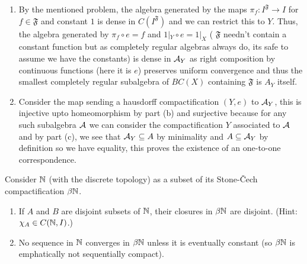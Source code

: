 \documentclass[12pt,a4paper]{article}
\begin{document}
\begin{solution}
\begin{enumerate}[label=\alph*.]
        Thus, $\Phi|_{\beta Y}$ is also a homeomorphism into $\beta Y'$ and we can define a homeomorphism $\phi=i'^{-1}\circ\Phi|_{\beta Y}\circ i$ from $Y$ to $Y'$ for which $\phi\circ e=i'^{-1}\circ\Phi|_{\beta Y}\circ i\circ e=i^{-1}\circ i'\circ e'=e'$ and we are done.
    \item By the mentioned problem, the algebra generated by the maps $\pi_f:I^{\mathfrak F}\to I$ for $f\in\mathfrak F$ and constant $1$ is dense in $C(I^{\mathfrak F})$ and we can restrict this to $Y$. 
        Thus, the algebra generated by $\pi_f\circ e=f$ and $1|_Y\circ e=1|_X$ ( $\mathfrak F$ needn't contain a constant function but as completely regular algebras always do, its safe to assume we have the constants) is dense in $\mathcal{A}_Y$ as right composition by continuous functions (here it is $e$) preserves uniform convergence and thus the smallest completely regular subalgebra of $BC(X)$ containing $\mathfrak F$ is $A_Y$ itself. 
    \item Consider the map sending a hausdorff compactification $(Y,e)$ to $\mathcal{A}_Y$, this is injective upto homeomorphism by part (b) and surjective because for any such subalgebra $\mathcal{A}$ we can consider the compactification $Y$ associated to $\mathcal{A}$ and by part (c), we see that $\mathcal{A}_Y \subseteq A$ by minimality and $A \subseteq \mathcal{A}_Y$ by definition so we have equality, this proves the existence of an one-to-one correspondence. 
\end{enumerate}
\end{solution}
\begin{problem}\label{prob:4-74}
Consider $\mathbb{N}$ (with the discrete topology) as a subset of its Stone-\v{C}ech compactification $\beta\mathbb{N}$.
\begin{enumerate}[label=\alph*.]
    \item If $A$ and $B$ are disjoint subsets of $\mathbb{N}$, their closures in $\beta\mathbb{N}$ are disjoint. (Hint: $\chi_A \in C(\mathbb{N},I)$.)
    \item No sequence in $\mathbb{N}$ converges in $\beta\mathbb{N}$ unless it is eventually constant (so $\beta\mathbb{N}$ is emphatically not sequentially compact).
\end{enumerate}
\end{problem}
\end{document}
